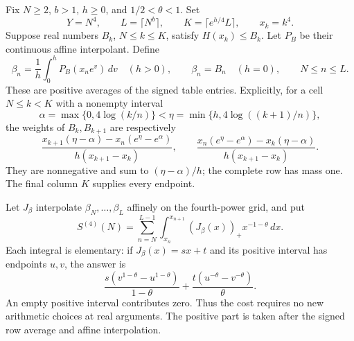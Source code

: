 Fix $N\ge2$, $b>1$, $h\ge0$, and $1/2<\theta<1$. Set
\begin{equation}\label{shared-fourth-grid}
 Y=N^4,\qquad L=\lceil N^b\rceil,\qquad
 K=\lceil e^{h/4}L\rceil,\qquad x_k=k^4.
\end{equation}
Suppose real numbers $B_k$, $N\le k\le K$, satisfy $H(x_k)\le B_k$.
Let $P_B$ be their continuous affine interpolant. Define
\begin{equation}\label{shared-fourth-rows}
 \beta_n=\frac1h\int_0^hP_B(x_ne^v)\,dv\quad(h>0),
 \qquad\beta_n=B_n\quad(h=0),\qquad N\le n\le L.
\end{equation}
These are positive averages of the signed table entries. Explicitly,
for a cell $N\le k<K$ with a nonempty interval
\[
 \alpha=\max\{0,4\log(k/n)\}<
 \eta=\min\{h,4\log((k+1)/n)\},
\]
the weights of $B_k,B_{k+1}$ are respectively
\begin{equation}\label{shared-fourth-hats}
 \frac{x_{k+1}(\eta-\alpha)-x_n(e^\eta-e^\alpha)}
      {h(x_{k+1}-x_k)},\qquad
 \frac{x_n(e^\eta-e^\alpha)-x_k(\eta-\alpha)}
      {h(x_{k+1}-x_k)}.
\end{equation}
They are nonnegative and sum to $(\eta-\alpha)/h$; the complete
row has mass one. The final column $K$ supplies every endpoint.

Let $J_\beta$ interpolate $\beta_N,\ldots,\beta_L$ affinely on
the fourth-power grid, and put
\begin{equation}\label{shared-fourth-cost}
 S^{(4)}(N)=\sum_{n=N}^{L-1}\int_{x_n}^{x_{n+1}}
                     (J_\beta(x))_+x^{-1-\theta}\,dx.
\end{equation}
Each integral is elementary: if $J_\beta(x)=s x+t$ and its
positive interval has endpoints $u,v$, the answer is
\[
 \frac{s(v^{1-\theta}-u^{1-\theta})}{1-\theta}
 +\frac{t(u^{-\theta}-v^{-\theta})}{\theta}.
\]
An empty positive interval contributes zero. Thus the cost requires
no new arithmetic choices at real arguments. The positive part is
taken after the signed row average and affine interpolation.

